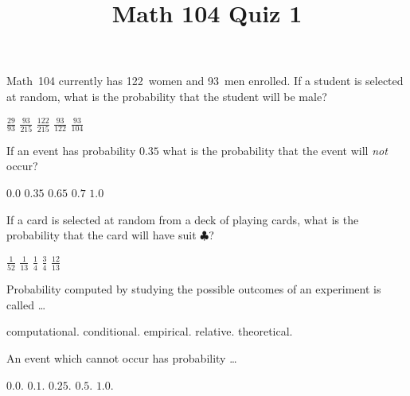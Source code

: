 \documentclass[12pt]{exam}
\title{Math 104 Quiz 1}
\begin{document}
\maketitle
\begin{center}
\end{center}

\begin{questions}
\question Math~104 currently has 122~women and 93~men enrolled.
If a student is selected at random, what is the probability
that the student will be male?\\
\begin{oneparchoices}
\choice $\frac{29}{93}$
\choice $\frac{93}{215}$
\choice $\frac{122}{215}$
\choice $\frac{93}{122}$
\choice $\frac{93}{104}$
\end{oneparchoices}

\question If an event has probability $0.35$
what is the probability that the event will {\em not} occur?\\
\begin{oneparchoices}
\choice $0.0$
\choice $0.35$
\choice $0.65$
\choice $0.7$
\choice $1.0$
\end{oneparchoices}

\question If a card is selected at random from a deck of
playing cards, what is the probability that
the card will have suit $\clubsuit$?\\
\begin{oneparchoices}
\choice $\frac{1}{52}$
\choice $\frac{1}{13}$
\choice $\frac{1}{4}$
\choice $\frac{3}{4}$
\choice $\frac{12}{13}$
\end{oneparchoices}

\question Probability computed by studying
the possible outcomes of an experiment is called \dots\\
\begin{oneparchoices}
\choice computational.
\choice conditional.
\choice empirical.
\choice relative.
\choice theoretical.
\end{oneparchoices}

\question An event which cannot occur has probability \dots\\
\begin{oneparchoices}
\choice $0.0$.
\choice $0.1$.
\choice $0.25$.
\choice $0.5$.
\choice $1.0$.
\end{oneparchoices}


\end{questions}
\end{document}

